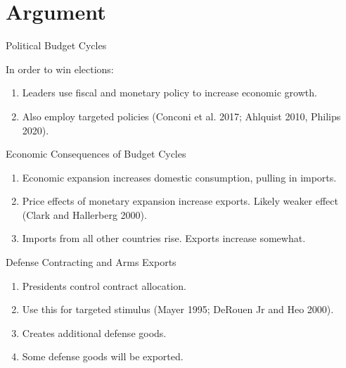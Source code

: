 \documentclass[12pt]{beamer}
\begin{document}

\section{Argument} 


\begin{frame}{Political Budget Cycles}

In order to win elections:
\pause 
\begin{enumerate} 
\item Leaders use fiscal and monetary policy to increase economic growth. 
\pause 
\item Also employ targeted policies (Conconi et al. 2017; Ahlquist 2010, Philips 2020). 
\end{enumerate}


\end{frame} 


\begin{frame}{Economic Consequences of Budget Cycles}

\pause 
\begin{enumerate} 
\item Economic expansion increases domestic consumption, pulling in imports.  
\pause 
\item Price effects of monetary expansion increase exports. Likely weaker effect (Clark and Hallerberg 2000). 
\pause
\item Imports from all other countries rise. Exports increase somewhat. 
\end{enumerate}


\end{frame} 


\begin{frame}{Defense Contracting and Arms Exports}

\pause 
\begin{enumerate} 
\item Presidents control contract allocation.  
\pause 
\item Use this for targeted stimulus (Mayer 1995; DeRouen Jr and Heo 2000).
\pause
\item Creates additional defense goods.
\pause
\item Some defense goods will be exported.
\end{enumerate}


\end{frame} 
\end{document}
